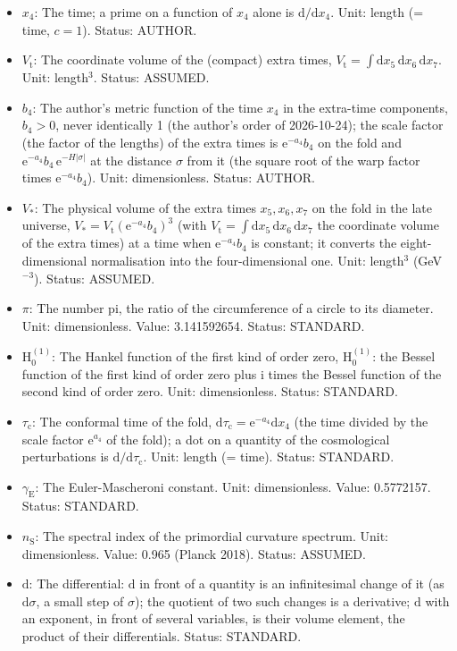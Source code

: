 \documentclass[
  10pt,
]{article}
\begin{document}
\begin{itemize}
  corrected on 2026-10-25); in UM-3 a free parameter. Unit: GeV
  (1/length). Status: AUTHOR.
\item
  \(x_4\): The time; a prime on a function of \(x_4\) alone is
  \(\mathrm{d}/\mathrm{d}x_4\). Unit: length (= time, \(c = 1\)).
  Status: AUTHOR.
\item
  \(V_{\mathrm{t}}\): The coordinate volume of the (compact) extra
  times,
  \(V_{\mathrm{t}} = \int\mathrm{d}x_5\,\mathrm{d}x_6\,\mathrm{d}x_7\).
  Unit: length\(^3\). Status: ASSUMED.
\item
  \(b_4\): The author's metric function of the time \(x_4\) in the
  extra-time components, \(b_4 > 0\), never identically 1 (the author's
  order of 2026-10-24); the scale factor (the factor of the lengths) of
  the extra times is \(\mathrm{e}^{-a_4}b_4\) on the fold and
  \(\mathrm{e}^{-a_4}b_4\,\mathrm{e}^{-H\lvert\sigma\rvert}\) at the
  distance \(\sigma\) from it (the square root of the warp factor times
  \(\mathrm{e}^{-a_4}b_4\)). Unit: dimensionless. Status: AUTHOR.
\item
  \(V_*\): The physical volume of the extra times \(x_5, x_6, x_7\) on
  the fold in the late universe,
  \(V_* = V_{\mathrm{t}}(\mathrm{e}^{-a_4}b_4)^3\) (with
  \(V_{\mathrm{t}} = \int\mathrm{d}x_5\,\mathrm{d}x_6\,\mathrm{d}x_7\)
  the coordinate volume of the extra times) at a time when
  \(\mathrm{e}^{-a_4}b_4\) is constant; it converts the
  eight-dimensional normalisation into the four-dimensional one. Unit:
  length\(^3\) (GeV\(^{-3}\)). Status: ASSUMED.
\item
  \(\pi\): The number pi, the ratio of the circumference of a circle to
  its diameter. Unit: dimensionless. Value: 3.141592654. Status:
  STANDARD.
\item
  \(\mathrm{H}^{(1)}_0\): The Hankel function of the first kind of order
  zero, \(\mathrm{H}^{(1)}_0\): the Bessel function of the first kind of
  order zero plus \(\mathrm{i}\) times the Bessel function of the second
  kind of order zero. Unit: dimensionless. Status: STANDARD.
\item
  \(\tau_{\mathrm{c}}\): The conformal time of the fold,
  \(\mathrm{d}\tau_{\mathrm{c}} = \mathrm{e}^{-a_4}\mathrm{d}x_4\) (the
  time divided by the scale factor \(\mathrm{e}^{a_4}\) of the fold); a
  dot on a quantity of the cosmological perturbations is
  \(\mathrm{d}/\mathrm{d}\tau_{\mathrm{c}}\). Unit: length (= time).
  Status: STANDARD.
\item
  \(\gamma_{\mathrm{E}}\): The Euler-Mascheroni constant. Unit:
  dimensionless. Value: 0.5772157. Status: STANDARD.
\item
  \(n_{\mathrm{S}}\): The spectral index of the primordial curvature
  spectrum. Unit: dimensionless. Value: 0.965 (Planck 2018). Status:
  ASSUMED.
\item
  \(\mathrm{d}\): The differential: \(\mathrm{d}\) in front of a
  quantity is an infinitesimal change of it (as \(\mathrm{d}\sigma\), a
  small step of \(\sigma\)); the quotient of two such changes is a
  derivative; \(\mathrm{d}\) with an exponent, in front of several
  variables, is their volume element, the product of their
  differentials. Status: STANDARD.
\end{itemize}
\end{document}
